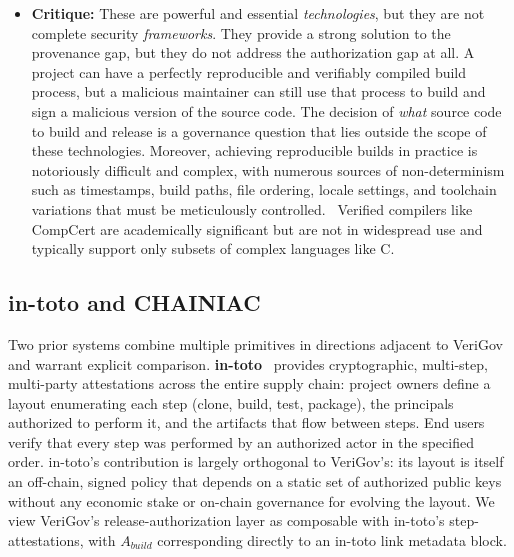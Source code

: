 \documentclass{article}
\begin{document}
\begin{itemize}
\item \textbf{Critique:} These are powerful and essential \emph{technologies}, but they are not complete security \emph{frameworks}. They provide a strong solution to the provenance gap, but they do not address the authorization gap at all. A project can have a perfectly reproducible and verifiably compiled build process, but a malicious maintainer can still use that process to build and sign a malicious version of the source code. The decision of \emph{what} source code to build and release is a governance question that lies outside the scope of these technologies. Moreover, achieving reproducible builds in practice is notoriously difficult and complex, with numerous sources of non-determinism such as timestamps, build paths, file ordering, locale settings, and toolchain variations that must be meticulously controlled.~\cite{lamb2022reproducible} Verified compilers like CompCert are academically significant but are not in widespread use and typically support only subsets of complex languages like C.~\cite{leroy2009compcert}
\end{itemize}

\subsection{in-toto and CHAINIAC}

Two prior systems combine multiple primitives in directions adjacent to VeriGov and warrant explicit comparison. \textbf{in-toto}~\cite{torres2019intoto} provides cryptographic, multi-step, multi-party attestations across the entire supply chain: project owners define a layout enumerating each step (clone, build, test, package), the principals authorized to perform it, and the artifacts that flow between steps. End users verify that every step was performed by an authorized actor in the specified order. in-toto's contribution is largely orthogonal to VeriGov's: its layout is itself an off-chain, signed policy that depends on a static set of authorized public keys without any economic stake or on-chain governance for evolving the layout. We view VeriGov's release-authorization layer as composable with in-toto's step-attestations, with $A_{build}$ corresponding directly to an in-toto link metadata block.
\end{document}
